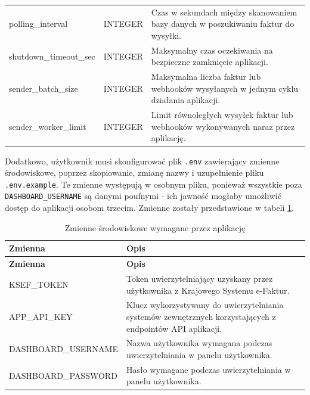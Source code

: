 \begin{small}
\begin{longtable}{>{\raggedright\arraybackslash}p{5.3cm} >{\raggedright\arraybackslash}p{1.7cm} >{\raggedright\arraybackslash}p{6cm}}
polling\_interval & INTEGER & Czas w sekundach między skanowaniem bazy danych w poszukiwaniu faktur do wysyłki. \\
shutdown\_timeout\_sec & INTEGER & Maksymalny czas oczekiwania na bezpieczne zamknięcie aplikacji. \\
sender\_batch\_size & INTEGER & Maksymalna liczba faktur lub webhooków wysyłanych w jednym cyklu działania aplikacji. \\
sender\_worker\_limit & INTEGER & Limit równoległych wysyłek faktur lub webhooków wykonywanych naraz przez aplikację. \\
\end{longtable}
\end{small}

Dodatkowo, użytkownik musi skonfigurować plik \texttt{.env} zawierający zmienne środowiskowe, poprzez skopiowanie, zmianę nazwy i uzupełnienie pliku \texttt{.env.example}. Te zmienne występują w osobnym pliku, ponieważ wszystkie poza \texttt{DASHBOARD\_USERNAME} są danymi poufnymi - ich jawność mogłaby umożliwić dostęp do aplikacji osobom trzecim. Zmienne zostały przedstawione w tabeli \ref{tab:environment_variables}.

\begin{small}
\begin{longtable}{
    >{\raggedright\arraybackslash}p{5.2cm}
    >{\raggedright\arraybackslash}p{9cm}
}
\caption{Zmienne środowiskowe wymagane przez aplikację}
\label{tab:environment_variables} \\
\toprule
\textbf{Zmienna} & \textbf{Opis} \\
\midrule
\endfirsthead

\toprule
\textbf{Zmienna} & \textbf{Opis} \\
\midrule
\endhead

\bottomrule
\endfoot

KSEF\_TOKEN
& Token uwierzytelniający uzyskany przez użytkownika z Krajowego Systemu e-Faktur. \\

APP\_API\_KEY
& Klucz wykorzystywany do uwierzytelniania systemów zewnętrznych korzystających z endpointów API aplikacji. \\

DASHBOARD\_USERNAME
& Nazwa użytkownika wymagana podczas uwierzytelniania w panelu użytkownika. \\

DASHBOARD\_PASSWORD
& Hasło wymagane podczas uwierzytelniania w panelu użytkownika. \\

\end{longtable}
\end{small}

